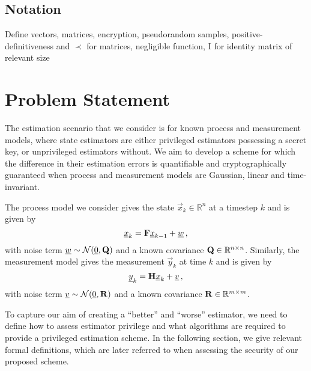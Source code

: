 \documentclass[conference]{IEEEtran}
\theoremstyle{definition}
\theoremstyle{definition}
\theoremstyle{remark}
\begin{document}
\subsection{Notation}
Define vectors, matrices, encryption, pseudorandom samples, positive-definitiveness and $\prec$ for matrices, negligible function, I for identity matrix of relevant size


% 
%                                              
%                                              
%                                              
% 

\section{Problem Statement}\label{sec:est_problem}
The estimation scenario that we consider is for known process and measurement models, where state estimators are either privileged estimators possessing a secret key, or unprivileged estimators without. We aim to develop a scheme for which the difference in their estimation errors is quantifiable and cryptographically guaranteed when process and measurement models are Gaussian, linear and time-invariant.

The process model we consider gives the state $\vec{x}_k\in\mathbb{R}^n$ at a timestep $k$ and is given by
\begin{equation}\label{eqn:linear_process_model}
   \vec{x}_k = \mat{F}\vec{x}_{k-1} + \vec{w}\,,
\end{equation}
with noise term ${\underline{w}}\sim \mathcal{N}({\underline{0}}, {{\mathbf{Q}}})$ and a known covariance ${{\mathbf{Q}}}\in \mathbb{R}^{n\times n}$. Similarly, the measurement model gives the measurement $\vec{y}_k$ at time $k$ and is given by
\begin{equation}\label{eqn:linear_measurement_model}
   \vec{y}_k = \mat{H}\vec{x}_k + \vec{v}\,,
\end{equation}
with noise term ${\underline{v}}\sim \mathcal{N}({\underline{0}}, {{\mathbf{R}}})$ and a known covariance ${{\mathbf{R}}}\in \mathbb{R}^{m\times m}$.

To capture our aim of creating a ``better'' and ``worse'' estimator, we need to define how to assess estimator privilege and what algorithms are required to provide a privileged estimation scheme. In the following section, we give relevant formal definitions, which are later referred to when assessing the security of our proposed scheme.
\end{document}
